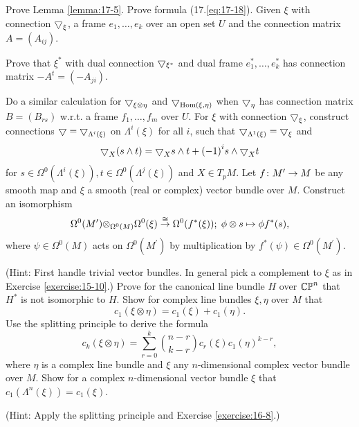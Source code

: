 \begin{enumerate}[\theexercise.1]
  \NewItem Prove Lemma \ref{lemma:17-5}.
  \NewItem Prove formula (17.\ref{eq:17-18}).
  \NewItem Given $\xi$ with connection ${\bigtriangledown }_{\xi }$, a frame ${e}_{1},\ldots,{e}_{k}$ over an open set $U$ and the connection matrix $A = ( {A}_{ij})$.\par
    Prove that ${\xi }^*$ with dual connection $\bigtriangledown_{\xi^*}$ and dual frame ${e}_{1}^*,\ldots,{e}_{k}^*$ has connection matrix $- {A}^{t} = ( {-{A}_{ji}})$.\par
    Do a similar calculation for ${\bigtriangledown }_{\xi  \otimes  \eta }$ and ${\bigtriangledown }_{\mathrm{Hom}( {\xi,\eta }) }$ when ${\bigtriangledown }_{\eta }$ has connection matrix $B = ( {B}_{rs})$ w.r.t. a frame ${f}_{1},\ldots,{f}_{m}$ over $U$.
  \NewItem For $\xi$ with connection ${\bigtriangledown }_{\xi }$, construct connections $\bigtriangledown  = {\bigtriangledown }_{{\Lambda }^{i}( \xi ) }$ on ${\Lambda }^{i}( \xi )$ for all $i$, such that ${\bigtriangledown }_{{\Lambda }^{1}( \xi ) } = {\bigtriangledown }_{\xi }$ and
    \[
      {\bigtriangledown }_{X}( {s \land  t})  = {\bigtriangledown }_{X}s \land  t + {(-1) }^{i}s \land  {\bigtriangledown}_{X}t
    \]
    for $s \in  {\Omega }^{0}( {{\Lambda }^{i}( \xi ) }),t \in  {\Omega }^{0}( {{\Lambda }^{j}( \xi ) })$ and $X \in  {T}_{p}M$.
  \NewItem Let $f\colon {M}^{\prime } \rightarrow  M$ be any smooth map and $\xi$ a smooth (real or complex) vector bundle over $M$. Construct an isomorphism
    \[
      {\Omega }^{0}( {M}^{\prime }) { \otimes  }_{{\Omega }^{0}( M) }{\Omega }^{0}( \xi ) \overset{ \cong  }{ \rightarrow  }{\Omega }^{0}( {{f}^*( \xi ) });\;\phi  \otimes  s \mapsto  \phi {f}^*( s),
    \]
    where $\psi  \in  {\Omega }^{0}( M)$ acts on ${\Omega }^{0}( {M}^{\prime })$ by multiplication by ${f}^*( \psi )  \in  {\Omega }^{0}( {M}^{\prime })$. \par(Hint: First handle trivial vector bundles. In general pick a complement to $\xi$ as in Exercise \ref{exercise:15-10}.)
  \newchap[18]
  \NewItem Prove for the canonical line bundle $H$ over ${\mathbb{{CP}}}^{n}$ that ${H}^*$ is not isomorphic to $H$.
  \NewItem Show for complex line bundles $\xi,\eta$ over $M$ that
    \[
      {c}_{1}( {\xi  \otimes  \eta })  = {c}_{1}( \xi )  + {c}_{1}( \eta ).
    \]
    Use the splitting principle to derive the formula
    \[
      {c}_{k}( {\xi  \otimes  \eta })  = \sum_{{r = 0}}^{k}\binom{n-r}{k-r}{c}_{r}( \xi ) {c}_{1}{( \eta ) }^{k- r},
    \]
    where $\eta$ is a complex line bundle and $\xi$ any $n$-dimensional complex vector bundle over $M$.
  \NewItem Show for a complex $n$-dimensional vector bundle $\xi$ that ${c}_{1}( {{\Lambda }^{n}( \xi ) })  = {c}_{1}( \xi )$. \par(Hint: Apply the splitting principle and Exercise \ref{exercise:16-8}.)

\end{enumerate}
